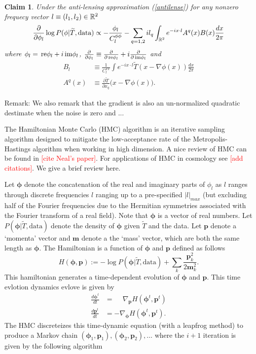 \documentclass[noinfoline]{imsart}
\newtheorem{claim}{Claim}
\newcommand{\re}{\text{\,\rm re}}
\newcommand{\im}{\text{\,\rm im}}
\newcommand{\bs}{\boldsymbol}
\begin{document}
\begin{claim}
\label{grad claim}
 Under the anti-lensing approximation (\ref{antilense}) for any nonzero frequecy vector $l\equiv (l_1, l_2) \in \Bbb R^2$ 
 \[\frac{\partial}{\partial \phi_l}\log P(\phi | \widetilde T,  \text{\rm data}) \propto -  \frac{\phi_l}{C^{\phi\phi}_{l}} -  \sum_{q=1,2} i  l_q \int_{\Bbb R^2} e^{-i x\cdot l} A^q(x)B(x) \frac{dx}{2\pi}   \]
 where  $\phi_l = \re \phi_l + i \im \phi_l$, $\frac{\partial}{\partial \phi_l}\equiv \frac{\partial}{\partial\re \phi_l} + i \frac{\partial}{\partial\im\phi_l}$ and 
 \begin{align}
 B_l &\equiv \frac{1}{C_l^{TT}} \int e^{-i x\cdot l}  \widetilde T(x-\nabla \phi(x))\frac{dx}{2\pi} \\ 
 A^q(x) &\equiv \frac{\partial\widetilde T}{\partial x_q}\bigl(x-\nabla \phi(x)\bigr).
 \end{align}
\end{claim}

{\rm Remark:}
We also remark that the gradient is also an un-normalized quadratic destimate when the noise is zero and ...



The Hamiltonian Monte Carlo (HMC) algorithm is an iterative sampling algorithm designed to mitigate the low-acceptance rate of the Metropolis-Hastings algorithm when working in high dimension. A nice review of HMC can be found in \textcolor{red}{[cite Neal's paper]}. For applications of HMC in cosmology see \textcolor{red}{[add citations]}. We give a brief review here. 

Let $\bs \phi$ denote the concatenation of the real and imaginary parts of $\phi_l$ as $l$ ranges through discrete frequencies $l$ ranging up to a pre-specified $|l|_{max}$ (but excluding  half of the Fourier frequencies due to the Hermitian symmetries associated with the Fourier transform of a real field). Note that $\bs \phi$ is a vector of real numbers. 
Let $P(\bs \phi|\widetilde T, \text{data})$ denote the density of $\bs \phi$ given $\widetilde T$ and the data. 
Let $\bs p$ denote a `momenta' vector and $\bs m$ denote a the `mass' vector, which are both the same length as $\bs \phi$. The Hamiltonian is a function of $\bs \phi$ and $\bs p$ defined as follows
\[ H(\bs \phi, \bs p):= -\log P(\bs \phi|\widetilde T, \text{data})+\sum_k \frac{\bs p_k^2}{2\bs m_k^2}. \]
This hamiltonian generates a time-dependent evolution of $\bs \phi$ and $\bs p$. 
 This time evlotion  dynamics evlove is given by 
\begin{align*}
\frac{d\bs \phi^t}{dt} &= \phantom{-}\nabla_{\bs p} H(\bs \phi^t, \bs p^t) \\
\frac{d\bs p^t}{dt}    &= -\nabla_{\bs \phi} H(\bs \phi^t, \bs p^t).
\end{align*} 
The HMC discreteizes  this time-dynamic equation (with a leapfrog method) to produce a Markov chain $(\bs \phi_1, \bs p_1), (\bs \phi_2, \bs p_2), \ldots$ where the $i+1$ iteration is given by the following algorithm
\end{document}
